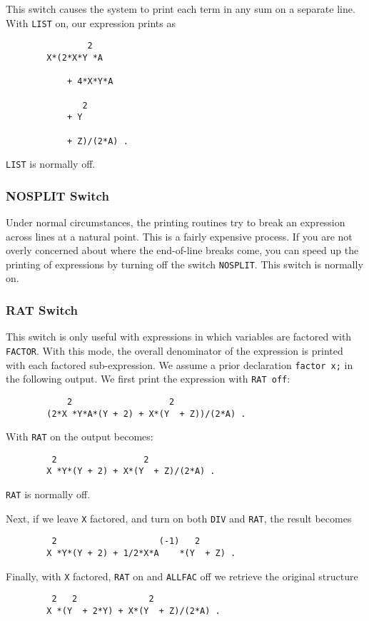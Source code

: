 This switch causes the system to print each term in any sum on a separate
line. With {\tt LIST} on, our expression prints as
\begin{verbatim}
                2
        X*(2*X*Y *A

            + 4*X*Y*A

               2
            + Y

            + Z)/(2*A) .
\end{verbatim}
{\tt LIST} is normally off.

\subsubsection{NOSPLIT Switch}

Under normal circumstances, the printing routines try to break an expression
across lines at a natural point.  This is a fairly expensive process.  If
you are not overly concerned about where the end-of-line breaks come, you
can speed up the printing of expressions by turning off the switch
{\tt NOSPLIT}.  This switch is normally on.

\subsubsection{RAT Switch}

This switch is only useful with expressions in which variables are
factored with {\tt FACTOR}. With this mode, the overall denominator of the
expression is printed with each factored sub-expression. We assume a prior
declaration {\tt factor x;} in the following output. We first print the
expression with {\tt RAT off}:
\begin{verbatim}
            2                   2
        (2*X *Y*A*(Y + 2) + X*(Y  + Z))/(2*A) .
\end{verbatim}
With {\tt RAT} on the output becomes:
\begin{verbatim}
         2                 2
        X *Y*(Y + 2) + X*(Y  + Z)/(2*A) .
\end{verbatim}
{\tt RAT} is normally off.

Next, if we leave {\tt X} factored, and turn on both {\tt DIV} and
{\tt RAT}, the result becomes
\begin{verbatim}
         2                    (-1)   2
        X *Y*(Y + 2) + 1/2*X*A    *(Y  + Z) .
\end{verbatim}
Finally, with {\tt X} factored, {\tt RAT} on and {\tt ALLFAC} 
off we retrieve the original structure
\begin{verbatim}
         2   2              2
        X *(Y  + 2*Y) + X*(Y  + Z)/(2*A) .
\end{verbatim}

